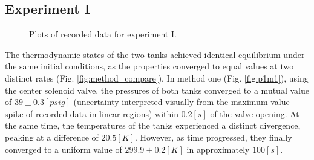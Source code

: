 \documentclass[12pt]{article}
\begin{document}
\subsection*{Experiment I}
\begin{figure}[t!]
    \centering
    \hfill
    \hfill
    \caption{Plots of recorded data for experiment I.}
    \label{fig:graphs1}
\end{figure}
The thermodynamic states of the two tanks achieved identical equilibrium under the same initial conditions, as the properties converged to equal values at two distinct rates (Fig. \ref{fig:method_compare}). 
In method one (Fig. \ref{fig:p1m1}), using the center solenoid valve, the pressures of both tanks converged to a mutual value of $39\pm0.3[psig]$ (uncertainty interpreted visually from the maximum value spike of recorded data in linear regions) within $0.2[s]$ of the valve opening. At the same time, the temperatures of the tanks experienced a distinct divergence, peaking at a difference of $20.5[K]$. However, as time progressed, they finally converged to a uniform value of $299.9\pm0.2[K]$ in approximately $100[s]$.
\end{document}
